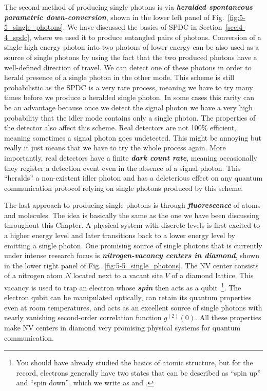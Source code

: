 The second method of producing single photons is via \textbf{\emph{heralded spontaneous parametric down-conversion}}, shown in the lower left panel of Fig.~\ref{fig:5-5_single_photons}.
We have discussed the basics of SPDC in Section~\ref{sec:4-4_spdc}, where we used it to produce entangled pairs of photons.
Conversion of a single high energy photon into two photons of lower energy can be also used as a source of single photons by using the fact that the two produced photons have a well-defined direction of travel.
We can detect one of these photons in order to herald presence of a single photon in the other mode.
This scheme is still probabilistic as the SPDC is a very rare process, meaning we have to try many times before we produce a heralded single photon.
In some cases this rarity can be an advantage because once we detect the signal photon we have a very high probability that the idler mode contains only a single photon.
The properties of the detector also affect this scheme.
Real detectors are not 100\% efficient, meaning sometimes a signal photon goes undetected.
This might be annoying but really it just means that we have to try the whole process again.
More importantly, real detectors have a finite \textbf{\emph{dark count rate}}, meaning occasionally they register a detection event even in the absence of a signal photon.
This ``heralds'' a non-existent idler photon and has a deleterious effect on any quantum communication protocol relying on single photons produced by this scheme.

The last approach to producing single photons is through \textit{\textbf{fluorescence}} of atoms and molecules.
The idea is basically the same as the one we have been discussing throughout this Chapter.
A physical system with discrete levels is first excited to a higher energy level and later transitions back to a lower energy level by emitting a single photon.
One promising source of single photons that is currently under intense research focus is \textbf{\emph{nitrogen-vacancy centers in diamond}}, shown in the lower right panel of Fig.~\ref{fig:5-5_single_photons}.
The NV center consists of a nitrogen atom $N$ located next to a vacant site $V$ of a diamond lattice.
This vacancy is used to trap an electron whose \textbf{\emph{spin}} then acts as a qubit~\footnote{You should have already studied the basics of atomic structure, but for the record, electrons generally have two states that can be described as ``spin up'' and ``spin down'', which we write as \ket{\uparrow} and \ket{\downarrow}.}.
The electron qubit can be manipulated optically, can retain its quantum properties even at room temperatures, and acts as an excellent source of single photons with nearly vanishing second-order correlation function $g^{(2)}(0)$.
All these properties make NV centers in diamond very promising physical systems for quantum communication.

